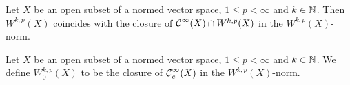 \begin{proposition}
Let $X$ be an open subset of a normed vector space, $1\leq p < \infty$ and $k\in\mathbb{N}$. Then $W^{k,p}(X)$ coincides with the closure of $\operatorname{\mathcal{C}}^\infty(X) \cap W^{k,p}(X)$ in the $W^{k,p}(X)$-norm.
\end{proposition}

\begin{definition}
Let $X$ be an open subset of a normed vector space, $1\leq p < \infty$ and $k\in\mathbb{N}$. We define $W_0^{k,p}(X)$ to be the closure of $\operatorname{\mathcal{C}}^\infty_c(X)$ in the $W^{k,p}(X)$-norm.
\end{definition}